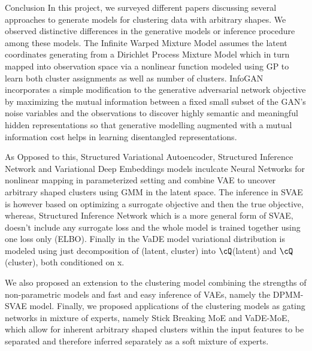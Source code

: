 \documentclass{article}
\begin{document}
\begin{psection}{Conclusion}
In this project, we surveyed different papers discussing several approaches to generate models for clustering data with arbitrary shapes. We observed distinctive differences in the generative models or inference procedure among these models. The Infinite Warped Mixture Model assumes the latent coordinates generating from a Dirichlet Process Mixture Model which in turn mapped into observation space via a nonlinear function modeled using GP to learn both cluster assignments as well as number of clusters. InfoGAN incorporates a simple modification to the generative adversarial network objective by maximizing the mutual information between a fixed small subset of the GAN's noise variables and the observations to discover highly semantic and meaningful hidden representations so  that generative modelling augmented with a mutual information cost helps in learning disentangled representations. 

As Opposed to this, Structured Variational Autoencoder, Structured Inference Network and Variational Deep Embeddings models inculcate Neural Networks for nonlinear mapping in parameterized setting and combine VAE to uncover arbitrary shaped clusters using GMM in the latent space. The inference in SVAE is however based on optimizing a surrogate objective and then the true objective, whereas, Structured Inference Network which is a more general form of SVAE, doesn't include any surrogate loss and the whole model is trained together using one loss only (ELBO). Finally in the VaDE model variational distribution is modeled using just decomposition of (latent, cluster) into $\cQ$(latent) and $\cQ$(cluster), both conditioned on x. 

We also proposed an extension to the clustering model combining the strengths of non-parametric models and fast and easy inference of VAEs, namely the DPMM-SVAE model. Finally, we proposed applications of the clustering models as gating networks in mixture of experts, namely Stick Breaking MoE and VaDE-MoE, which allow for inherent arbitrary shaped clusters within the input features to be separated and therefore inferred separately as a soft mixture of experts.

\end{psection}



\end{document}
